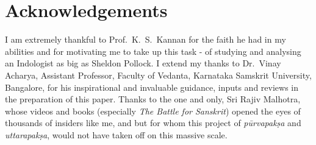 \section*{Acknowledgements}

I am extremely thankful to Prof.~K.~S.~Kannan for the faith he had in my abilities and for motivating me to take up this task - of studying and analysing an Indologist as big as Sheldon Pollock. I extend my thanks to Dr.~Vinay Acharya, Assistant Professor, Faculty of Vedanta, Karnataka Samskrit University, Bangalore, for his inspirational and invaluable guidance, inputs and reviews in the preparation of this paper. Thanks to the one and only, Sri Rajiv Malhotra, whose videos and books (especially \textsl{The Battle for Sanskrit}) opened the eyes of thousands of insiders like me, and but for whom this project of {\it pūrvapakṣa} and {\it uttarapakṣa}, would not have taken off on this massive scale.

